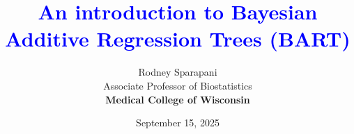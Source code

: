\documentclass[11pt,dvipsnames,usenames,times]{beamer}
\title{\textcolor{blue}{\normalsize 
An introduction to Bayesian Additive Regression Trees (BART)}}
\author{Rodney Sparapani\\
Associate Professor of Biostatistics\\
\textcolor{PineGreen}{\bf Medical College of Wisconsin}
}
\date{
September 15, 2025
}
\begin{document}
\titlepage
\boldmath


\end{document}
